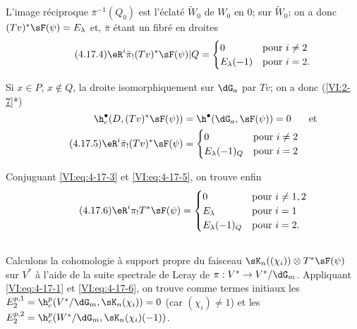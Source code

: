 L'image réciproque $\bar\pi^{-1}(Q_0)$ est l'éclaté $\widetilde W_0$ de 
$W_0$ en $0$;  sur $\widetilde W_0$; on a donc 
$(T v)^\ast \sF(\psi)=E_\lambda$  et, $\bar\pi$ étant un 
fibré en droites 
\begin{equation*}\tag{4.17.4}\label{VI:eq:4-17-4}
  \eR^i \bar\pi_! (T v)^\ast \sF(\psi)|Q = 
    \begin{cases}
      0 & \text{pour $i\ne 2$} \\
      E_\lambda(-1) & \text{pour $i=2$.} 
    \end{cases} 
\end{equation*}

Si $x\in P$, $x\notin Q$, la droite   
isomorphiquement sur $\dG_a$ par $T v$; on a donc 
(\ref{VI:2-7}*) 
\begin{align} \notag 
  \h_c^\bullet(D,(T v)^\ast \sF(\psi)) &= \h^\bullet(\dG_a,\sF(\psi)) = 0 && \text{et} \\
  \tag{4.17.5}\label{VI:eq:4-17-5}
  \eR^i \bar\pi_! (T v)^\ast \sF(\psi) 
    &= \begin{cases} 
         0 & \text{pour $i\ne 2$} \\
         E_\lambda(-1)_Q & \text{pour $i=2$} 
       \end{cases} 
\end{align}

Conjuguant \eqref{VI:eq:4-17-3} et \eqref{VI:eq:4-17-5}, on trouve enfin 
\begin{equation*}\tag{4.17.6}\label{VI:eq:4-17-6}
  \eR^i \pi_! T^\ast\sF(\psi) = 
    \begin{cases}
      0 & \text{pour $i\ne 1,2$} \\
      E_\lambda & \text{pour $i=1$} \\
      E_\lambda(-1)_Q & \text{pour $i=2$.} 
    \end{cases}
\end{equation*}





\subsection{}\label{VI:4-18}

Calculons la cohomologie à support propre du faisceau 
$\sK_n((\chi_i))\otimes T^\ast \sF(\psi)$ sur $V^\ast$ à l'aide de la suite 
spectrale de Leray de $\pi:V^\ast\to V^\ast/\dG_m$. Appliquant 
\eqref{VI:eq:4-17-1} et \eqref{VI:eq:4-17-6}, on trouve comme termes initiaux 
les $E_2^{p,1} = \h_c^p(V^\ast/\dG_m,\sK_n(\chi_i)) = 0$ (car $(\chi_i)\ne 1$) 
et les $E_2^{p,2} = \h_c^p(W^\ast/\dG_m,\sK_n(\chi_i)(-1))$. 

